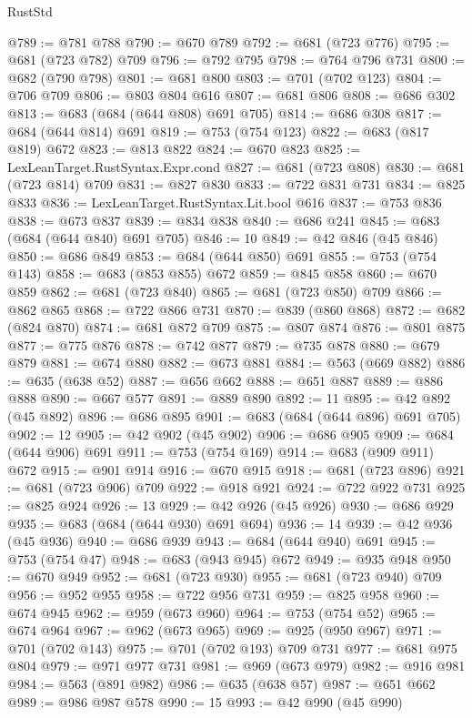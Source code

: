 \begin{lexlean}{RustStd}
\begin{coremodule}
@789 := @781 @788
@790 := @670 @789
@792 := @681 (@723 @776)
@795 := @681 (@723 @782) @709
@796 := @792 @795
@798 := @764 @796 @731
@800 := @682 (@790 @798)
@801 := @681 @800
@803 := @701 (@702 @123)
@804 := @706 @709
@806 := @803 @804 @616
@807 := @681 @806
@808 := @686 @302
@813 := @683 (@684 (@644 @808) @691 @705)
@814 := @686 @308
@817 := @684 (@644 @814) @691
@819 := @753 (@754 @123)
@822 := @683 (@817 @819) @672
@823 := @813 @822
@824 := @670 @823
@825 := LexLeanTarget.RustSyntax.Expr.cond
@827 := @681 (@723 @808)
@830 := @681 (@723 @814) @709
@831 := @827 @830
@833 := @722 @831 @731
@834 := @825 @833
@836 := LexLeanTarget.RustSyntax.Lit.bool @616
@837 := @753 @836
@838 := @673 @837
@839 := @834 @838
@840 := @686 @241
@845 := @683 (@684 (@644 @840) @691 @705)
@846 := 10
@849 := @42 @846 (@45 @846)
@850 := @686 @849
@853 := @684 (@644 @850) @691
@855 := @753 (@754 @143)
@858 := @683 (@853 @855) @672
@859 := @845 @858
@860 := @670 @859
@862 := @681 (@723 @840)
@865 := @681 (@723 @850) @709
@866 := @862 @865
@868 := @722 @866 @731
@870 := @839 (@860 @868)
@872 := @682 (@824 @870)
@874 := @681 @872 @709
@875 := @807 @874
@876 := @801 @875
@877 := @775 @876
@878 := @742 @877
@879 := @735 @878
@880 := @679 @879
@881 := @674 @880
@882 := @673 @881
@884 := @563 (@669 @882)
@886 := @635 (@638 @52)
@887 := @656 @662
@888 := @651 @887
@889 := @886 @888
@890 := @667 @577
@891 := @889 @890
@892 := 11
@895 := @42 @892 (@45 @892)
@896 := @686 @895
@901 := @683 (@684 (@644 @896) @691 @705)
@902 := 12
@905 := @42 @902 (@45 @902)
@906 := @686 @905
@909 := @684 (@644 @906) @691
@911 := @753 (@754 @169)
@914 := @683 (@909 @911) @672
@915 := @901 @914
@916 := @670 @915
@918 := @681 (@723 @896)
@921 := @681 (@723 @906) @709
@922 := @918 @921
@924 := @722 @922 @731
@925 := @825 @924
@926 := 13
@929 := @42 @926 (@45 @926)
@930 := @686 @929
@935 := @683 (@684 (@644 @930) @691 @694)
@936 := 14
@939 := @42 @936 (@45 @936)
@940 := @686 @939
@943 := @684 (@644 @940) @691
@945 := @753 (@754 @47)
@948 := @683 (@943 @945) @672
@949 := @935 @948
@950 := @670 @949
@952 := @681 (@723 @930)
@955 := @681 (@723 @940) @709
@956 := @952 @955
@958 := @722 @956 @731
@959 := @825 @958
@960 := @674 @945
@962 := @959 (@673 @960)
@964 := @753 (@754 @52)
@965 := @674 @964
@967 := @962 (@673 @965)
@969 := @925 (@950 @967)
@971 := @701 (@702 @143)
@975 := @701 (@702 @193) @709 @731
@977 := @681 @975 @804
@979 := @971 @977 @731
@981 := @969 (@673 @979)
@982 := @916 @981
@984 := @563 (@891 @982)
@986 := @635 (@638 @57)
@987 := @651 @662
@989 := @986 @987 @578
@990 := 15
@993 := @42 @990 (@45 @990)

\end{coremodule}
\end{lexlean}
